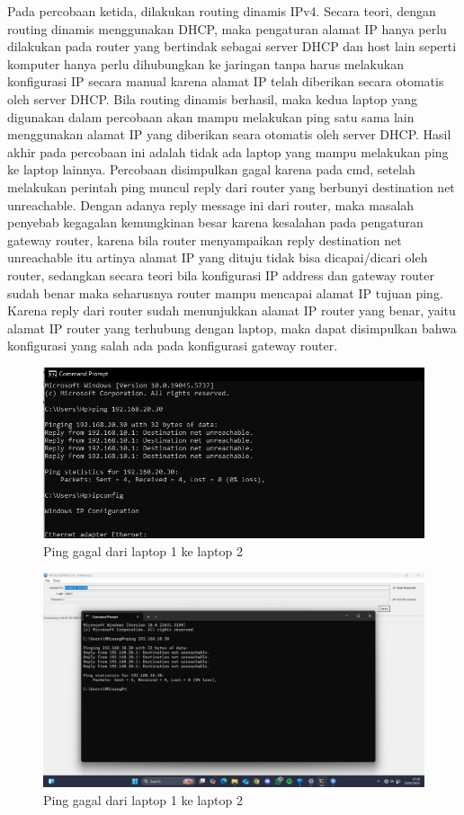 Pada percobaan ketida, dilakukan routing dinamis IPv4. Secara teori, dengan routing dinamis menggunakan DHCP, maka pengaturan alamat IP hanya perlu dilakukan pada router yang bertindak sebagai server DHCP dan host lain seperti komputer hanya perlu dihubungkan ke jaringan tanpa harus melakukan konfigurasi IP secara manual karena alamat IP telah diberikan secara otomatis oleh server DHCP. Bila routing dinamis berhasil, maka kedua laptop yang digunakan dalam percobaan akan mampu melakukan ping satu sama lain menggunakan alamat IP yang diberikan seara otomatis oleh server DHCP. Hasil akhir pada percobaan ini adalah tidak ada laptop yang mampu melakukan ping ke laptop lainnya. Percobaan disimpulkan gagal karena pada cmd, setelah melakukan perintah ping muncul reply dari router yang berbunyi destination net unreachable. Dengan adanya reply message ini dari router, maka masalah penyebab kegagalan kemungkinan besar karena kesalahan pada pengaturan gateway router, karena bila router menyampaikan reply destination net unreachable itu artinya alamat IP yang dituju tidak bisa dicapai/dicari oleh router, sedangkan secara teori bila konfigurasi IP address dan gateway router sudah benar maka seharusnya router mampu mencapai alamat IP tujuan ping. Karena reply dari router sudah menunjukkan alamat IP router yang benar, yaitu alamat IP router yang terhubung dengan laptop, maka dapat disimpulkan bahwa konfigurasi yang salah ada pada konfigurasi gateway router.
\begin{figure}[H]
	\centering
	\includegraphics[scale=0.55]{P1/img/ping dhcp 10.1.jpg}
	\caption{Ping gagal dari laptop 1 ke laptop 2}
\end{figure}
\begin{figure}[H]
	\centering
	\includegraphics[scale=0.5]{P1/img/ping dhcp 20.1.jpg}
	\caption{Ping gagal dari laptop 1 ke laptop 2}
\end{figure}


